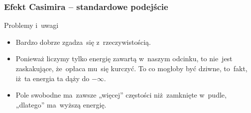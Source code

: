 \documentclass[10pt,t]{beamer}
\begin{document}
\begin{frame}
  \frametitle{Efekt Casimira -- standardowe podejście}


  Problemy i~uwagi
  \begin{itemize}

  \item Bardzo dobrze zgadza~się z~rzeczywistością.

  \item Ponieważ liczymy tylko energię zawartą w~naszym odcinku,
    to nie~jest zaskakujące, że~opłaca mu~się kurczyć. To co mogłoby
    być dziwne, to~fakt, iż~ta energia ta dąży do $-\infty$.

  \item Pole swobodne ma~zawsze „więcej” częstości niż~zamknięte
    w~pudle, „dlatego” ma~wyższą energię.

  \end{itemize}

\end{frame}










\end{document}

